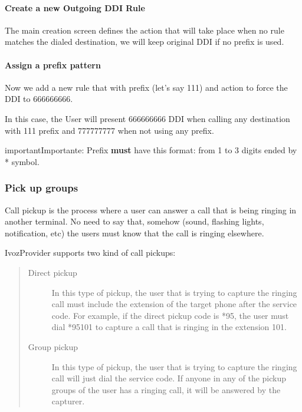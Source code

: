 \documentclass[letterpaper,10pt,spanish]{sphinxmanual}
\begin{document}
\paragraph{Create a new Outgoing DDI Rule}

The main creation screen defines the action that will take place when no rule
matches the dialed destination, we will keep original DDI if no prefix is used.
\paragraph{Assign a prefix pattern}

Now we add a new rule that with prefix (let's say 111) and action to force
the DDI to 666666666.

In this case, the User will present 666666666 DDI when calling any destination
with 111 prefix and 777777777 when not using any prefix.

\begin{notice}{important}{Importante:}
Prefix \textbf{must} have this format: from 1 to 3 digits ended by * symbol.
\end{notice}


\subsubsection{Pick up groups}
\label{administration_portal/client/vpbx/user_configuration/pick_up_groups:capture-groups}\label{administration_portal/client/vpbx/user_configuration/pick_up_groups:pick-up-groups}\label{administration_portal/client/vpbx/user_configuration/pick_up_groups::doc}
Call pickup is the process where a user can answer a call that is being ringing
in another terminal. No need to say that, somehow (sound, flashing lights,
notification, etc) the users must know that the call is ringing elsewhere.

IvozProvider supports two kind of call pickups:
\begin{quote}
\begin{description}
\item[{Direct pickup}] \leavevmode
In this type of pickup, the user that is trying to capture the ringing
call must include the extension of the target phone after the service
code. For example, if the direct pickup code is *95, the user must
dial *95101 to capture a call that is ringing in the extension 101.

\item[{Group pickup}] \leavevmode
In this type of pickup, the user that is trying to capture the ringing
call will just dial the service code. If anyone in any of the pickup
groups of the user has a ringing call, it will be answered by the
capturer.

\end{description}
\end{quote}
\end{document}
